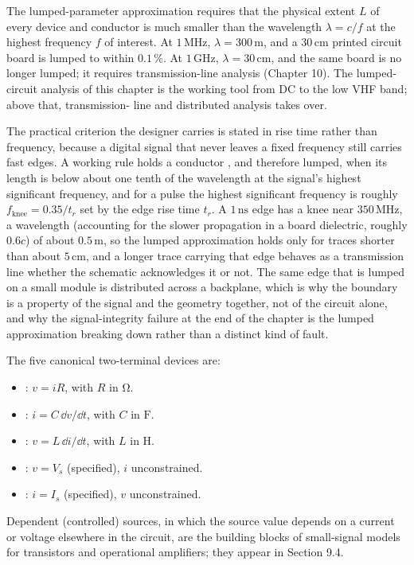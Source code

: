 The lumped-parameter approximation requires that the physical extent
$L$ of every device and conductor is much smaller than the wavelength
$\lambda = c/f$ at the highest frequency $f$ of interest. At $1\,\si{
\mega\hertz}$, $\lambda = 300\,\si{\meter}$, and a $30\,\si{\centi
\meter}$ printed circuit board is lumped to within $0.1\,\%$. At
$1\,\si{\giga\hertz}$, $\lambda = 30\,\si{\centi\meter}$, and the same
board is no longer lumped; it requires transmission-line analysis
(Chapter 10). The lumped-circuit analysis of this chapter is the
working tool from DC to the low VHF band; above that, transmission-
line and distributed analysis takes over.

The practical criterion the designer carries is stated in rise time rather than
frequency, because a digital signal that never leaves a fixed frequency still
carries fast edges. A working rule holds a conductor , and therefore lumped, when its length is below about one tenth of the
wavelength at the signal's highest significant frequency, and for a pulse the
highest significant frequency is roughly $f_{\text{knee}} = 0.35/t_r$ set by the
edge rise time $t_r$. A $1\,\si{\nano\second}$ edge has a knee near $350\,\si{
\mega\hertz}$, a wavelength (accounting for the slower propagation in a board
dielectric, roughly $0.6c$) of about $0.5\,\si{\meter}$, so the lumped
approximation holds only for traces shorter than about $5\,\si{\centi\meter}$,
and a longer trace carrying that edge behaves as a transmission line whether the
schematic acknowledges it or not. The same edge that is lumped on a small module
is distributed across a backplane, which is why the boundary is a property of the
signal and the geometry together, not of the circuit alone, and why the
signal-integrity failure at the end of the chapter is the lumped approximation
breaking down rather than a distinct kind of fault.

The five canonical two-terminal devices are:
\begin{itemize}[leftmargin=*]
  \item {}: $v = iR$, with $R$ in $\si{\ohm}$.
  \item {}: $i = C\,\dd v/\dd t$, with $C$ in $\si{
    \farad}$.
  \item {}: $v = L\,\dd i/\dd t$, with $L$ in $\si{
    \henry}$.
  \item {}: $v = V_{s}$ (specified),
    $i$ unconstrained.
  \item {}: $i = I_{s}$ (specified),
    $v$ unconstrained.
\end{itemize}
Dependent (controlled) sources, in which the source value depends on
a current or voltage elsewhere in the circuit, are the building
blocks of small-signal models for transistors and operational
amplifiers; they appear in Section 9.4.

